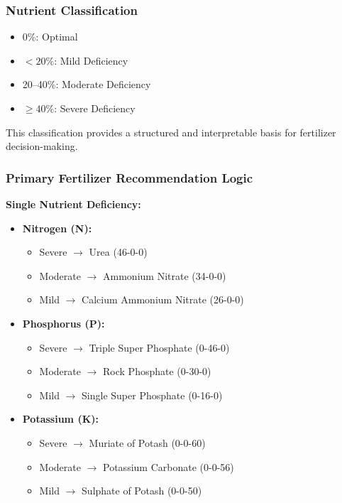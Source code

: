 \documentclass[conference]{IEEEtran}
\begin{document}
\subsubsection{Nutrient Classification}
\begin{itemize}
\item 0\%: Optimal
\item $< 20\%$: Mild Deficiency
\item 20--40\%: Moderate Deficiency
\item $\geq 40\%$: Severe Deficiency
\end{itemize}
This classification provides a structured and interpretable basis for fertilizer decision-making.

\subsubsection{Primary Fertilizer Recommendation Logic}
\textbf{Single Nutrient Deficiency:}
\begin{itemize}
\item \textbf{Nitrogen (N):}
\begin{itemize}
\item Severe $\rightarrow$ Urea (46-0-0)
\item Moderate $\rightarrow$ Ammonium Nitrate (34-0-0)
\item Mild $\rightarrow$ Calcium Ammonium Nitrate (26-0-0)
\end{itemize}

\item \textbf{Phosphorus (P):}
\begin{itemize}
\item Severe $\rightarrow$ Triple Super Phosphate (0-46-0)
\item Moderate $\rightarrow$ Rock Phosphate (0-30-0)
\item Mild $\rightarrow$ Single Super Phosphate (0-16-0)
\end{itemize}

\item \textbf{Potassium (K):}
\begin{itemize}
\item Severe $\rightarrow$ Muriate of Potash (0-0-60)
\item Moderate $\rightarrow$ Potassium Carbonate (0-0-56)
\item Mild $\rightarrow$ Sulphate of Potash (0-0-50)
\end{itemize}
\end{itemize}
\end{document}
